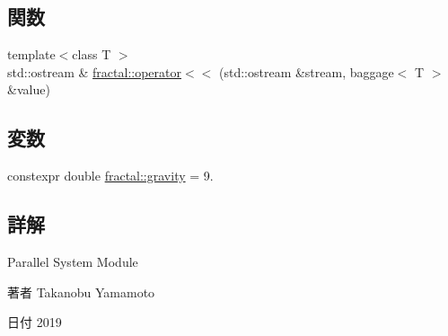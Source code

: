 \subsection*{関数}
\begin{DoxyCompactItemize}
\item 
{\footnotesize template$<$class T $>$ }\\std\+::ostream \& \hyperlink{namespacefractal_abe8d2436bc90b6911384070a496cc49a}{fractal\+::operator$<$$<$} (std\+::ostream \&stream, baggage$<$ T $>$ \&value)
\end{DoxyCompactItemize}
\subsection*{変数}
\begin{DoxyCompactItemize}
\item 
constexpr double \hyperlink{namespacefractal_aa98984c2091bb576a2063ed295e024f7}{fractal\+::gravity} = 9.
\end{DoxyCompactItemize}


\subsection{詳解}
Parallel System Module 

\begin{DoxyAuthor}{著者}
Takanobu Yamamoto 
\end{DoxyAuthor}
\begin{DoxyDate}{日付}
2019 
\end{DoxyDate}

